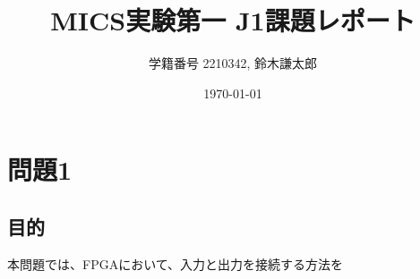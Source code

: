 \documentclass[autodetect-engine, dvi=dvipdfmx, 10pt, a4paper, ja=standard]{bxjsarticle}
\title{MICS実験第一 J1課題レポート}
\author{学籍番号 2210342, 鈴木謙太郎}
\date{\today}
\begin{document}
\maketitle



\section{問題1}

\subsection{目的}

本問題では、FPGAにおいて、入力と出力を接続する方法を
\end{document}
